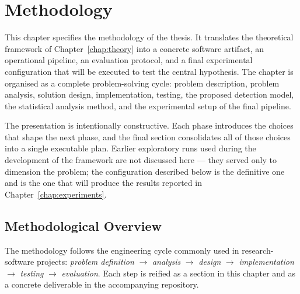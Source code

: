 
\chapter{Methodology}
\label{chap:methods}

This chapter specifies the methodology of the thesis. It translates the
theoretical framework of Chapter~\ref{chap:theory} into a concrete software
artifact, an operational pipeline, an evaluation protocol, and a final
experimental configuration that will be executed to test the central
hypothesis. The chapter is organised as a complete problem-solving cycle:
problem description, problem analysis, solution design, implementation,
testing, the proposed detection model, the statistical analysis method, and
the experimental setup of the final pipeline.

The presentation is intentionally constructive. Each phase introduces the
choices that shape the next phase, and the final section consolidates all of
those choices into a single executable plan. Earlier exploratory runs used
during the development of the framework are not discussed here — they served
only to dimension the problem; the configuration described below is the
definitive one and is the one that will produce the results reported in
Chapter~\ref{chap:experiments}.

\section{Methodological Overview}
\label{sec:method_overview}

The methodology follows the engineering cycle commonly used in
research-software projects: \emph{problem definition} $\rightarrow$
\emph{analysis} $\rightarrow$ \emph{design} $\rightarrow$
\emph{implementation} $\rightarrow$ \emph{testing} $\rightarrow$
\emph{evaluation}. Each step is reified as a section in this chapter and as
a concrete deliverable in the accompanying repository.

